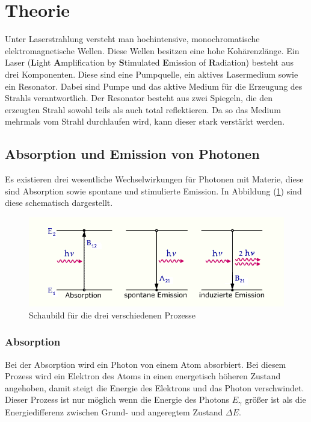 \section{Theorie}
\label{sec:Theorie}
Unter Laserstrahlung versteht man hochintensive, monochromatische elektromagnetische Wellen. Diese Wellen besitzen eine hohe Kohärenzlänge.
Ein Laser (\textbf{L}ight \textbf{A}mplification by \textbf{S}timulated \textbf{E}mission of \textbf{R}adiation) besteht aus drei Komponenten. Diese sind
eine Pumpquelle, ein aktives Lasermedium sowie ein Resonator. Dabei sind Pumpe und das aktive Medium für die Erzeugung des Strahls verantwortlich. Der Resonator besteht aus zwei Spiegeln, die den erzeugten Strahl sowohl teils als
auch total reflektieren. Da so das Medium mehrmals vom Strahl durchlaufen wird, kann dieser stark verstärkt werden.
\subsection{Absorption und Emission von Photonen}
\label{sec:theorie1}
Es existieren drei wesentliche Wechselwirkungen für Photonen mit Materie, diese sind Absorption sowie spontane und stimulierte Emission.
In Abbildung (\ref{fig:3prozess}) sind diese schematisch dargestellt.
\begin{figure}[h!]
  \centering
  \includegraphics[scale=0.7]{fig/3prozess.png}
  \caption{Schaubild für die drei verschiedenen Prozesse \cite{Anleitung1}}
  \label{fig:3prozess}
\end{figure}
\subsubsection{Absorption}
Bei der Absorption wird ein Photon von einem Atom absorbiert. Bei diesem Prozess wird ein Elektron des Atoms in einen energetisch höheren Zustand angehoben, damit steigt die Energie des Elektrons und das Photon verschwindet.
Dieser Prozess ist nur möglich wenn die Energie des Photons $E_\mathrm{\gamma}$ größer ist als die Energiedifferenz zwischen Grund- und angeregtem Zustand $\Delta E$.
